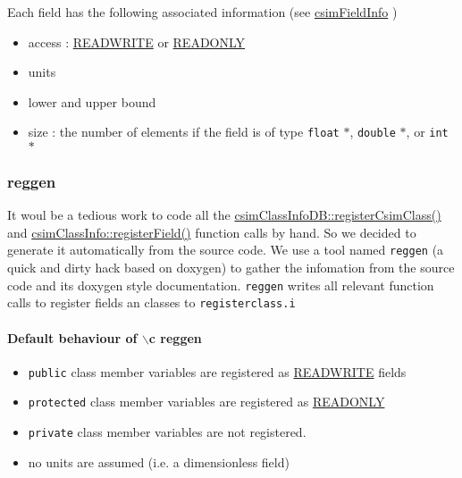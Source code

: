 Each field has the following associated information (see \hyperlink{classcsimFieldInfo}{csim\-Field\-Info} )\begin{itemize}
\item access : \hyperlink{csimclass_8h_a7}{READWRITE} or \hyperlink{csimclass_8h_a6}{READONLY}\item units\item lower and upper bound\item size : the number of elements if the field is of type {\tt float} $\ast$, {\tt double} $\ast$, or {\tt int} $\ast$\end{itemize}
\hypertarget{fields_reggen}{}\subsubsection{reggen}\label{fields_reggen}
It woul be a tedious work to code all the \hyperlink{classcsimClassInfoDB_a2}{csim\-Class\-Info\-DB::register\-Csim\-Class()} and \hyperlink{classcsimClassInfo_z1_0}{csim\-Class\-Info::register\-Field()} function calls by hand. So we decided to generate it automatically from the source code. We use a tool named {\tt reggen} (a quick and dirty hack based on doxygen) to gather the infomation from the source code and its doxygen style documentation. {\tt reggen} writes all relevant function calls to register fields an classes to {\tt registerclass.i} \hypertarget{fields_def}{}\paragraph{Default behaviour of $\backslash$c reggen}\label{fields_def}
\begin{itemize}
\item {\tt public} class member variables are registered as \hyperlink{csimclass_8h_a7}{READWRITE} fields\end{itemize}


\begin{itemize}
\item {\tt protected} class member variables are registered as \hyperlink{csimclass_8h_a6}{READONLY}\end{itemize}


\begin{itemize}
\item {\tt private} class member variables are not registered.\end{itemize}


\begin{itemize}
\item no units are assumed (i.e. a dimensionless field)\end{itemize}


